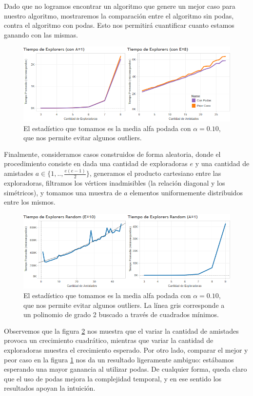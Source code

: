 \documentclass{article}
\theoremstyle{definition}
\theoremstyle{remark}
\begin{document}
Dado que no logramos encontrar un algoritmo que genere un mejor caso para nuestro algoritmo, mostraremos la comparación entre el algoritmo sin podas, contra el algoritmo con podas. Esto nos permitirá cuantificar cuanto estamos ganando con las mismas.

\begin{figure}[h!]
\centering
\includegraphics[width=15cm]{images/ex3-best-worst}
\caption{El estadístico que tomamos es la media alfa podada con $\alpha = 0.10$, que nos permite evitar algunos outliers. \label{grf:ex3-best-worst}}
\end{figure}

Finalmente, consideramos casos construidos de forma aleatoria, donde el procedimiento consiste en dada una cantidad de exploradoras $e$ y una cantidad de amistades $a \in \{1, .., \frac{e(e-1)}{2}\}$, generamos el producto cartesiano entre las exploradoras, filtramos los vértices inadmisibles (la relación diagonal y los simétricos), y tomamos una muestra de $a$ elementos uniformemente distribuidos entre los mismos.

\begin{figure}[h!]
\centering
\includegraphics[width=15cm]{images/ex3-random}
\caption{El estadístico que tomamos es la media alfa podada con $\alpha = 0.10$, que nos permite evitar algunos outliers. La línea gris corresponde a un polinomio de grado 2 buscado a través de cuadrados mínimos. \label{grf:ex3-random}}
\end{figure}

Observemos que la figura \ref{grf:ex3-random} nos muestra que el variar la cantidad de amistades provoca un crecimiento cuadrático, mientras que variar la cantidad de exploradoras muestra el crecimiento esperado. Por otro lado, comparar el mejor y peor caso en la figura \ref{grf:ex3-best-worst} nos da un resultado ligeramente ambiguo: estábamos esperando una mayor ganancia al utilizar podas. De cualquier forma, queda claro que el uso de podas mejora la complejidad temporal, y en ese sentido los resultados apoyan la intuición.
\end{document}
